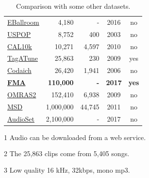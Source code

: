 \documentclass{article}
\begin{document}
\begin{table}
\begin{threeparttable}
\begin{tabular}{lrrcc}
		\href{http://anasynth.ircam.fr/home/media/ExtendedBallroom}{EBallroom} \cite{extballroom} & 4,180 & - & 2016 & no\tnote{1} \\
		\href{https://labrosa.ee.columbia.edu/projects/musicsim/uspop2002.html}{USPOP} \cite{uspop} & 8,752 & 400 & 2003 & no \\
		\href{http://calab1.ucsd.edu/~datasets/cal10k/}{CAL10k} \cite{cal10k} & 10,271 & 4,597 & 2010 & no \\ %
		\href{http://mirg.city.ac.uk/codeapps/the-magnatagatune-dataset}{TagATune} \cite{magnatagatune} & 25,863\tnote{2} & 230 & 2009 & yes\tnote{3} \\ %
		\href{http://jmir.sourceforge.net/index_Codaich.html}{Codaich} \cite{codaich} & 26,420 & 1,941 & 2006 & no \\ %
		\bf \href{https://github.com/mdeff/fma/}{FMA} & \bf 110,000 & \bf - & \bf 2017 & \bf yes \\
		\href{http://www.omras2.org/}{OMRAS2} \cite{omras} & 152,410 & 6,938 & 2009 & no \\
		\href{https://labrosa.ee.columbia.edu/millionsong/}{MSD} \cite{msd} & 1,000,000 & 44,745 & 2011 & no\tnote{1} \\
		\href{https://research.google.com/audioset/}{AudioSet} \cite{audioset} & 2,100,000 & - & 2017 & no\tnote{1} \\
		\bottomrule
	\end{tabular}
	\begin{tablenotes}
		\item[1] Audio can be downloaded from a web service. %
		\item[2] The 25,863 clips come from 5,405 songs.
		\item[3] Low quality 16 kHz, 32kbps, mono mp3.
	\end{tablenotes}
	\end{threeparttable}
	\caption{Comparison with some other datasets.}
	\label{tab:datasets}
\end{table}


\end{document}
